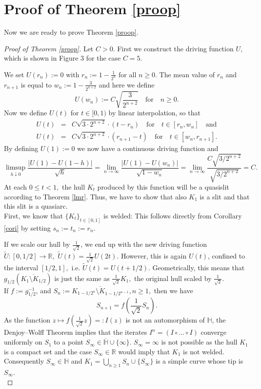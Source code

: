 \documentclass[11pt]{amsart}
\numberwithin{equation}{section}
\theoremstyle{plain}
\theoremstyle{definition}
\begin{document}
\section{Proof of Theorem \ref{proop}}

Now we are ready to prove Theorem \ref{proop}.

\begin{proof}[Proof of Theorem \ref{proop}]
Let $C>0.$ First we construct the driving function $U$, which is shown in Figure 3 for the case $C=5$. 

We set $U(r_n):=0$ with $r_n:=1-\frac1{2^n}$ for all $n\geq 0.$ The mean value of $r_n$ and $r_{n+1}$ is equal to $w_n:=1-\frac3{2^{n+2}}$ and here we define $$U(w_n) := C\sqrt{\frac3{2^{n+2}}}\quad \text{for} \quad n\geq0.$$ Now we define $U(t)$ for $t\in[0,1)$ by linear interpolation, so that 
\begin{eqnarray*}
 U(t)&=& C\sqrt{3\cdot2^{n+2}}\cdot (t-r_n) \quad \text{for} \quad t\in[r_n, w_n]\quad \text{and}\\
U(t)&=& C\sqrt{3\cdot2^{n+2}}\cdot (r_{n+1}-t) \quad \text{for} \quad t\in[w_n,r_{n+1}].
\end{eqnarray*}
  By defining $U(1):=0$ we now have a continuous driving function and 
$$ \limsup_{h\downarrow0}\frac{|U(1)-U(1-h)|}{\sqrt{h}}=
\lim_{n\to\infty}\frac{|U(1)-U(w_n)|}{\sqrt{1-w_n}} = 
\lim_{n\to\infty}\frac{C\sqrt{3/2^{n+2}}}{\sqrt{3/2^{n+2}}} = C.$$
At each $0\leq t <1,$ the hull $K_t$ produced by this function will be a quasislit according to Theorem \ref{lmr}. Thus, we have to show that also $K_1$ is a slit and that this slit is a quasiarc.\\

First, we know that $\{K_t\}_{t\in[0,1]}$ is welded: This follows directly from  Corollary \ref{cori} by setting $s_n:=t_n:=r_n$.

If we scale our hull by $\frac1{\sqrt{2}}$, we end up with the new driving function $\tilde{U}:[0,1/2]\to{\mathbb R},$ $\tilde{U}(t)=\frac1{\sqrt{2}}U(2t)$. However, this is again $U(t)$, confined to the interval $[1/2,1],$ i.e. $\tilde{U}(t)=U(t+1/2).$ Geometrically, this means that $g_{1/2}(\overline{K_1\setminus K_{1/2}})$ is just the same as $\frac1{\sqrt{2}}K_1,$ the original hull scaled by $\frac1{\sqrt{2}}.$\\

If $f:=g_{1/2}^{-1}$, and $S_n:=\overline{K_{1-1/2^n}\setminus K_{1-1/2^{n-1}}}, n\geq1,$ then  we have  $$S_{n+1}=f\left(\frac1{\sqrt{2}}S_n\right).$$
As the function $z\mapsto f(\frac{1}{\sqrt{2}}z)=:I(z)$ is not an automorphism of ${\mathbb H}$, the Denjoy--Wolff Theorem implies that the iterates $I^n=(I\circ\ldots\circ I)$ converge uniformly on $S_1$ to a point $S_\infty \in \overline{\mathbb H}\cup\{\infty\}.$ $S_\infty=\infty$ is not possible as the hull $K_1$ is a compact set and the case $S_\infty\in {\mathbb R}$ would imply that $K_1$ is not welded. Consequently $S_\infty\in {\mathbb H}$ and $K_1=\displaystyle \bigcup_{n\geq 1} S_n \cup \{S_\infty\}$ is a simple curve whose tip is $S_\infty$.\\


\end{proof}
\end{document}
